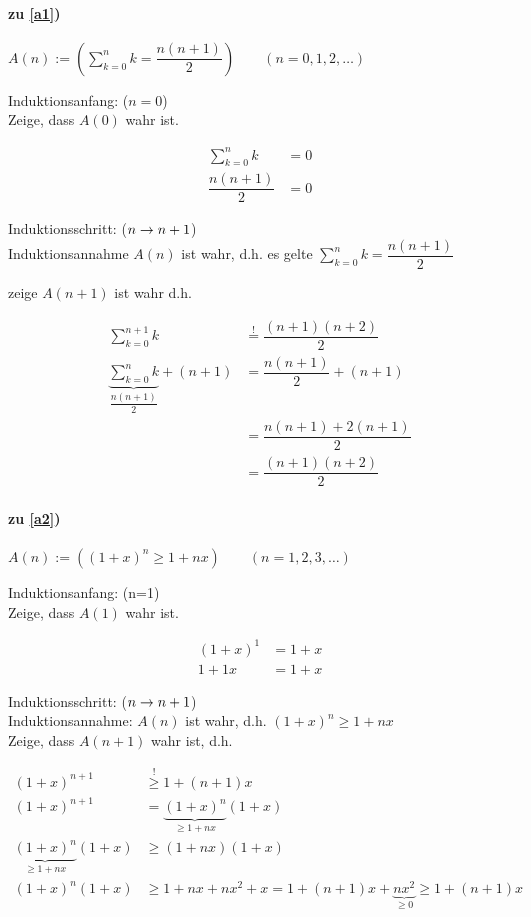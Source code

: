 \paragraph{zu \ref*{a1})}

$A(n):=(\sum\limits_{k=0}^{n}k = \dfrac{n(n+1)}{2})\qquad (n= 0,1,2,\ldots)$

Induktionsanfang: ($n=0$)\\
Zeige, dass $A(0)$ wahr ist.

\begin{align*}
\sum\limits_{k=0}^{n}k &= 0\\
\dfrac{n(n+1)}{2} &= 0
\end{align*}

Induktionsschritt: ($n\rightarrow n+1$)\\
Induktionsannahme $A(n)$ ist wahr, d.h. es gelte $\sum\limits_{k=0}^{n}k = \dfrac{n(n+1)}{2}$

zeige $A(n+1)$ ist wahr d.h.

\begin{align*}
\sum\limits_{k=0}^{n+1}k &\stackrel{!}{=} \dfrac{(n+1)(n+2)}{2}\\
\underbrace{\sum\limits_{k=0}^{n}k}_{\dfrac{n(n+1)}{2}} + (n+1) &= \dfrac{n(n+1)}{2} +(n+1)\\
&= \dfrac{n(n+1)+2(n+1)}{2}\\
&= \dfrac{(n+1)(n+2)}{2}
\end{align*}

\paragraph{zu \ref*{a2})}

$A(n):= ((1+x)^n\ge 1+nx)\qquad (n= 1,2,3,\ldots)$

Induktionsanfang: (n=1)\\
Zeige, dass $A(1)$ wahr ist.

\begin{align*}
(1+x)^1&= 1+x\\
1+1x&=1+x
\end{align*}

Induktionsschritt: ($n\rightarrow n+1$)\\
Induktionsannahme: $A(n)$ ist wahr, d.h. $(1+x)^n \ge 1+nx$\\
Zeige, dass $A(n+1)$ wahr ist, d.h.

\begin{align*}
(1+x)^{n+1} &\stackrel{!}{\ge} 1+(n+1)x\\
(1+x)^{n+1} &=\underbrace{(1+x)^n}_{\ge 1+nx}(1+x)\\
\underbrace{(1+x)^n}_{\ge 1+nx}(1+x)&\ge (1+nx)(1+x)\\
(1+x)^n(1+x)&\ge 1+nx+nx^2+x =1+(n+1)x+\underbrace{nx^2}_{\ge 0}\ge 1+(n+1)x
\end{align*}

